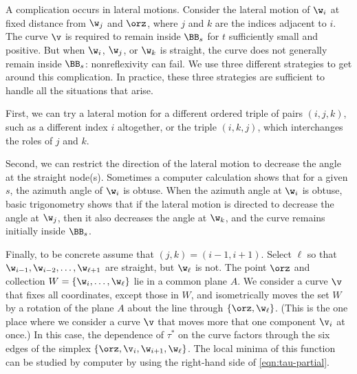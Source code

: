 \figGJBTZJI %

\begin{remark}
  A complication occurs in lateral motions.  Consider the lateral
  motion of $\w_i$ at fixed distance from $\w_j$ and $\orz$, where $j$
  and $k$ are the indices adjacent to $i$.  The curve $\v$ is required
  to remain inside $\BB_s$ for $t$ sufficiently small and positive.
  But when $\w_i$, $\w_j$, or $\w_k$ is straight, the curve does not
  generally remain inside $\BB_s$: nonreflexivity can fail.  We use
  three different strategies to get around this complication.  In
  practice, these three strategies are sufficient to handle all the
  situations that arise.

  First, we can try a lateral motion for a different ordered triple of
  pairs $(i,j,k)$, such as a different index $i$ altogether, or the
  triple $(i,k,j)$, which interchanges the roles of $j$ and $k$.
 
  Second, we can restrict the direction of the lateral motion to
  decrease the angle at the straight node(s).  Sometimes a computer
  calculation shows that for a given $s$, the azimuth angle of $\w_i$
  is obtuse.  When the azimuth angle at $\w_i$ is obtuse, basic
  trigonometry shows that if the lateral motion is directed to
  decrease the angle at $\w_j$, then it also decreases the angle at
  $\w_k$, and the curve remains initially inside $\BB_s$.

  Finally, to be concrete assume that $(j,k)=(i-1,i+1)$.  Select $\ell$
  so that $\w_{i-1},\w_{i-2},\ldots,\w_{\ell+1}$ are straight, but
  $\w_{\ell}$ is not. The point $\orz$ and collection
  $W=\{\w_{i},\ldots,\w_{\ell}\}$ lie in a common plane $A$.  We
  consider a curve $\v$ that fixes all coordinates, except those in
  $W$, and isometrically moves the set $W$ by a rotation of the plane
  $A$ about the line through $\{\orz,\w_{\ell}\}$.  (This is the one
  place where we consider a curve $\v$ that moves more that one
  component $\v_i$ at once.)  In this case, the dependence of $\tau^*$
  on the curve factors through the six edges of the simplex
  $\{\orz,\v_i,\w_{i+1},\w_{\ell}\}$.  The local minima of this
  function can be studied by computer by using the right-hand side of
  \eqref{eqn:tau-partial}.
\end{remark}

